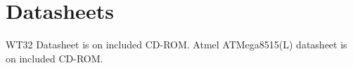 \chapter{Datasheets}


WT32 Datasheet is on included CD-ROM.
Atmel ATMega8515(L) datasheet is on included CD-ROM.
%
%

%









